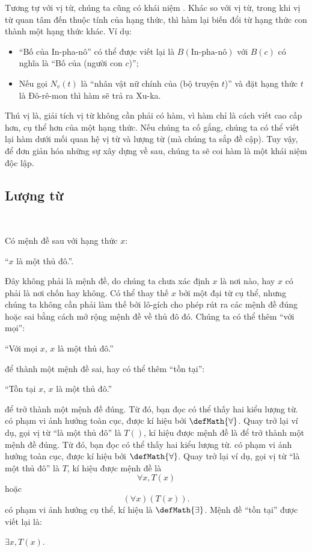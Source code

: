 Tương tự với vị từ, chúng ta cũng có khái niệm . Khác so với vị từ, trong khi vị từ quan tâm đến thuộc tính của hạng thức, thì hàm lại biến đổi từ hạng thức con thành một hạng thức khác. Ví dụ:
\begin{itemize}
   \item ``Bố của In-pha-nô'' có thể được viết lại là $B(\text{In-pha-nô})$ với $B(c)$ có nghĩa là ``Bố của (người con $c$)'';
   \item Nếu gọi $N_v(t)$ là ``nhân vật nữ chính của (bộ truyện $t$)'' và đặt hạng thức $t$ là Đô-rê-mon thì hàm sẽ trả ra Xu-ka.
\end{itemize}

Thú vị là, giải tích vị từ không cần phải có hàm, vì hàm chỉ là cách viết cao cấp hơn, cụ thể hơn của một hạng thức. Nếu chúng ta cố gắng, chúng ta có thể viết lại hàm dưới mối quan hệ vị từ và lượng từ (mà chúng ta sắp đề cập). Tuy vậy, để đơn giản hóa những sự xây dựng về sau, chúng ta sẽ coi hàm là một khái niệm độc lập.

\subsection{Lượng từ}

\ %

Có mệnh đề sau với hạng thức $x$:
\begin{center}
    ``$x$ là một thủ đô.''.
\end{center}
Đây không phải là mệnh đề, do chúng ta chưa xác định $x$ là nơi nào, hay $x$ có phải là nơi chốn hay không. Có thể thay thế $x$ bởi một đại từ cụ thể, nhưng chúng ta không cần phải làm thế bởi lô-gích cho phép rút ra các mệnh đề đúng hoặc sai bằng cách mở rộng mệnh đề về thủ đô đó. Chúng ta có thể thêm ``với mọi'':
\begin{center}
    ``Với mọi $x$, $x$ là một thủ đô.''
\end{center}
để thành một mệnh đề sai, hay có thể thêm ``tồn tại'':
\begin{center}
    ``Tồn tại $x$, $x$ là một thủ đô.''
\end{center}
để trở thành một mệnh đề đúng. Từ đó, bạn đọc có thể thấy hai kiểu lượng từ.  có phạm vi ảnh hưởng toàn cục, được kí hiệu bởi $\defMath{\forall}$. Quay trở lại ví dụ, gọi vị từ ``là một thủ đô'' là $T()$, kí hiệu được mệnh đề là
để trở thành một mệnh đề đúng. Từ đó, bạn đọc có thể thấy hai kiểu lượng từ.  có phạm vi ảnh hưởng toàn cục, được kí hiệu bởi $\defMath{\forall}$. Quay trở lại ví dụ, gọi vị từ ``là một thủ đô'' là $T$, kí hiệu được mệnh đề là
\begin{equation*}
    \forall x, T(x)
\end{equation*}
hoặc
\begin{equation*}
   (\forall x)(T(x)). 
\end{equation*}
 có phạm vi ảnh hưởng cụ thể, kí hiệu là $\defMath{\exists}$. Mệnh đề ``tồn tại'' được viết lại là:
\begin{center}
   $\exists x, T(x)$.
\end{center}

